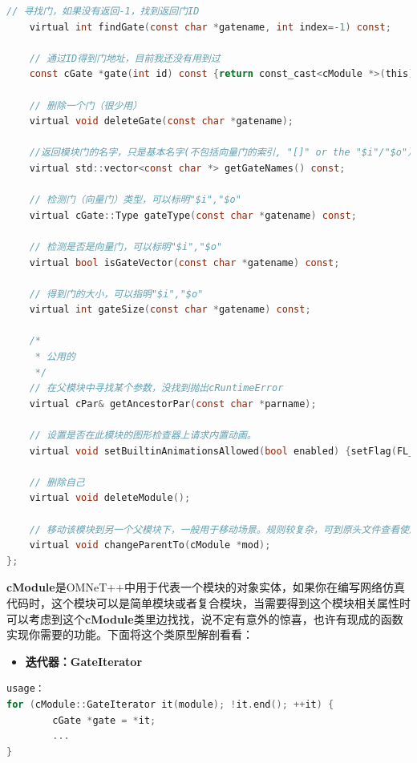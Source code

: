 \begin{lstlisting}[language=c]
    // 寻找门，如果没有返回-1，找到返回门ID
    virtual int findGate(const char *gatename, int index=-1) const;

    // 通过ID得到门地址，目前我还没有用到过
    const cGate *gate(int id) const {return const_cast<cModule *>(this)->gate(id);}

    // 删除一个门（很少用）
    virtual void deleteGate(const char *gatename);

    //返回模块门的名字，只是基本名字(不包括向量门的索引, "[]" or the "$i"/"$o"）
    virtual std::vector<const char *> getGateNames() const;

    // 检测门（向量门）类型，可以标明"$i","$o"
    virtual cGate::Type gateType(const char *gatename) const;

    // 检测是否是向量门，可以标明"$i","$o"
    virtual bool isGateVector(const char *gatename) const;

    // 得到门的大小，可以指明"$i","$o"
    virtual int gateSize(const char *gatename) const;

    /*
     * 公用的
     */
    // 在父模块中寻找某个参数，没找到抛出cRuntimeError
    virtual cPar& getAncestorPar(const char *parname);

    // 设置是否在此模块的图形检查器上请求内置动画。
    virtual void setBuiltinAnimationsAllowed(bool enabled) {setFlag(FL_BUILTIN_ANIMATIONS, enabled);}

    // 删除自己
    virtual void deleteModule();

    // 移动该模块到另一个父模块下，一般用于移动场景。规则较复杂，可到原头文件查看使用说明
    virtual void changeParentTo(cModule *mod);
};
\end{lstlisting}

\textbf{cModule}是OMNeT++中用于代表一个模块的对象实体，如果你在编写网络仿真代码时，这个模块可以是简单模块或者复合模块，当需要得到这个模块相关属性时可以考虑到这个\textbf{cModule}类里边找找，说不定有意外的惊喜，也许有现成的函数实现你需要的功能。下面将这个类原型解剖看看：

\begin{itemize}
\item \textbf{迭代器：GateIterator}

\end{itemize}

\begin{lstlisting}[language=c]
usage：
for (cModule::GateIterator it(module); !it.end(); ++it) {
        cGate *gate = *it;
        ...
}
\end{lstlisting}

